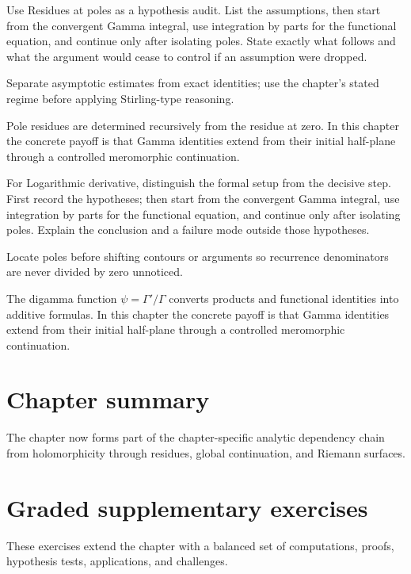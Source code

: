\begin{exercise}\label{exr:iv19-07}
Use Residues at poles as a hypothesis audit. List the assumptions, then start from the convergent Gamma integral, use integration by parts for the functional equation, and continue only after isolating poles. State exactly what follows and what the argument would cease to control if an assumption were dropped.
\end{exercise}
\begin{hint}
Separate asymptotic estimates from exact identities; use the chapter's stated regime before applying Stirling-type reasoning.
\end{hint}
\begin{solution}
Pole residues are determined recursively from the residue at zero. In this chapter the concrete payoff is that Gamma identities extend from their initial half-plane through a controlled meromorphic continuation.
\end{solution}

\begin{exercise}\label{exr:iv19-08}
For Logarithmic derivative, distinguish the formal setup from the decisive step. First record the hypotheses; then start from the convergent Gamma integral, use integration by parts for the functional equation, and continue only after isolating poles. Explain the conclusion and a failure mode outside those hypotheses.
\end{exercise}
\begin{hint}
Locate poles before shifting contours or arguments so recurrence denominators are never divided by zero unnoticed.
\end{hint}
\begin{solution}
The digamma function $\psi=\Gamma'/\Gamma$ converts products and functional identities into additive formulas. In this chapter the concrete payoff is that Gamma identities extend from their initial half-plane through a controlled meromorphic continuation.
\end{solution}

\section*{Chapter summary}
The chapter now forms part of the chapter-specific analytic dependency chain from holomorphicity through residues, global continuation, and Riemann surfaces.
\section{Graded supplementary exercises}
These exercises extend the chapter with a balanced set of computations, proofs, hypothesis tests, applications, and challenges.

